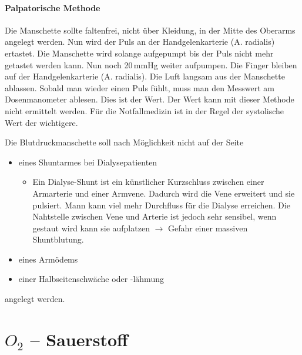 \paragraph{Palpatorische Methode}
Die Manschette sollte faltenfrei, nicht über Kleidung, in der
Mitte des Oberarms angelegt werden. Nun wird der Puls an der
Handgelenkarterie (A. radialis) ertastet. Die Manschette
wird solange aufgepumpt bis der Puls nicht mehr getastet werden
kann. Nun noch 20\,mmHg weiter aufpumpen. Die Finger bleiben
auf der Handgelenkarterie (A. radialis). Die Luft langsam
aus der Manschette ablassen. Sobald man wieder einen Puls fühlt,
muss man den Messwert am Dosenmanometer ablesen. Dies ist der
 Wert. Der  Wert kann mit
dieser Methode nicht ermittelt werden. Für die Notfallmedizin
ist in der Regel der systolische Wert der wichtigere.


Die Blutdruckmanschette soll nach Möglichkeit nicht auf der Seite
\begin{itemize}
	\item eines Shuntarmes bei Dialysepatienten
	\begin{itemize}
		\item Ein Dialyse-Shunt ist ein künstlicher Kurzschluss
		zwischen einer Armarterie und einer Armvene. Dadurch wird
		die Vene erweitert und sie pulsiert. Mann kann viel mehr
		Durchfluss für die Dialyse erreichen. Die Nahtstelle
		zwischen Vene und Arterie ist jedoch sehr sensibel, wenn
		gestaut wird kann sie aufplatzen $\rightarrow$ Gefahr
		einer massiven Shuntblutung.
	\end{itemize}
		\item eines Armödems
		\item einer Halbseitenschwäche oder -lähmung 
\end{itemize}
angelegt werden.





\section{$O_2$ --
Sauerstoff}\label{topic:sauerstoff}\label{topic:o2}


